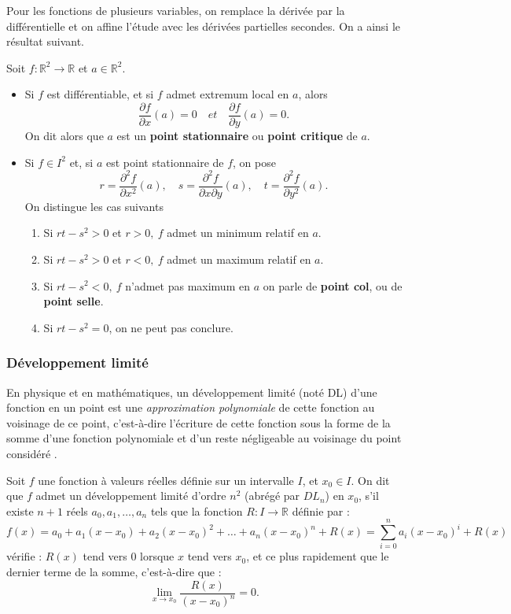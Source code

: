 Pour les fonctions de plusieurs variables, on remplace la dérivée par la différentielle et on affine l'étude avec les dérivées partielles secondes. On a ainsi le résultat suivant.

\begin{theorem}
	
	Soit $f: \mathbb{R}^2\rightarrow \mathbb{R} $  et $a \in \mathbb{R}^2 $.
	\begin{itemize}
		\item Si $f$ est différentiable, et si $f$ admet extremum local en $a$, alors 
		$$
		\frac{\partial f}{\partial x}(a)=0 \quad et \quad \frac{\partial f}{\partial y}(a)=0.
		$$
		On dit alors que $a$ est un \textbf{point stationnaire} ou \textbf{point critique} de $a$.
		\item Si $f \in I^2$ et, si  $a$ est point stationnaire de $f$, on pose
		$$ 
		r = \frac{\partial^2 f}{\partial x^2 }(a), \quad
		s = \frac{\partial^2 f}{\partial x \partial y }(a), \quad
		t = \frac{\partial^2 f}{\partial y^2 }(a).
		$$
		On distingue les cas suivants
		\begin{enumerate}
			\item Si $rt-s^2 > 0$ et $r > 0,\ f$ admet un minimum relatif en $a$.
			\item Si $rt-s^2 > 0$ et $r < 0,\ f$ admet un maximum relatif en $a$.
			\item Si $rt-s^2 < 0,\ f$ n'admet pas maximum en $a$ on parle de \textbf{point col}, ou de \textbf{point selle}.
			\item Si $rt-s^2 = 0$, on ne peut pas conclure.	
		\end{enumerate} 
	\end{itemize}
\end{theorem}


\subsubsection{\textbf{Développement limité}}\label{sec:dev_lim}
En physique et en mathématiques, un développement limité (noté DL) d'une fonction en un point est une \textit{approximation polynomiale} de cette fonction au voisinage de ce point, c'est-à-dire l'écriture de cette fonction sous la forme de la somme d'une fonction polynomiale et d'un reste négligeable au voisinage du point considéré \cite{coulombeau2013math, benner2015numerical}.

Soit $f$ une fonction à valeurs réelles définie sur un intervalle $I$, et $x_0 \in I$. On dit que $f$ admet un développement limité d'ordre $n^2$ (abrégé par $DL_n$) en $x_0$, s'il existe $n + 1$ réels $a_0, a_1, \dots, a_n$  tels que la fonction ${\displaystyle R:I\to \mathbb {R} }$ définie par :
$${\displaystyle f(x)=a_{0}+a_{1}(x-x_{0})+a_{2}(x-x_{0})^{2}+\dots+a_{n}(x-x_{0})^{n}+R(x)=\sum _{i=0}^{n}a_{i}(x-x_{0})^{i}+R(x)}$$
vérifie : $R(x)$ tend vers $0$ lorsque $x$ tend vers $x_0$, et ce plus rapidement que le dernier terme de la somme, c'est-à-dire que :
$$
\lim _{{x\rightarrow x_{0}}}{\frac{R(x)}{(x-x_{0})^{n}}}=0. 
$$

